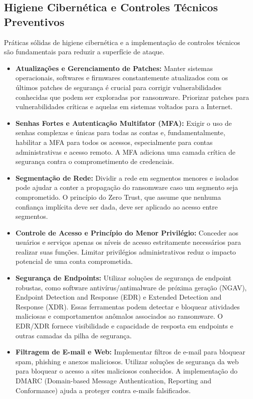 \subsection{Higiene Cibernética e Controles Técnicos Preventivos}
Práticas sólidas de higiene cibernética e a implementação de controles técnicos são fundamentais para reduzir a superfície de ataque.
\begin{itemize}
    \item \textbf{Atualizações e Gerenciamento de Patches:} Manter sistemas operacionais, softwares e firmwares constantemente atualizados com os últimos patches de segurança é crucial para corrigir vulnerabilidades conhecidas que podem ser exploradas por ransomware. Priorizar patches para vulnerabilidades críticas e aquelas em sistemas voltados para a Internet.
    \item \textbf{Senhas Fortes e Autenticação Multifator (MFA):} Exigir o uso de senhas complexas e únicas para todas as contas e, fundamentalmente, habilitar a MFA para todos os acessos, especialmente para contas administrativas e acesso remoto. A MFA adiciona uma camada crítica de segurança contra o comprometimento de credenciais.
    \item \textbf{Segmentação de Rede:} Dividir a rede em segmentos menores e isolados pode ajudar a conter a propagação do ransomware caso um segmento seja comprometido. O princípio do Zero Trust, que assume que nenhuma confiança implícita deve ser dada, deve ser aplicado ao acesso entre segmentos.
    \item \textbf{Controle de Acesso e Princípio do Menor Privilégio:} Conceder aos usuários e serviços apenas os níveis de acesso estritamente necessários para realizar suas funções. Limitar privilégios administrativos reduz o impacto potencial de uma conta comprometida.
    \item \textbf{Segurança de Endpoints:} Utilizar soluções de segurança de endpoint robustas, como software antivírus/antimalware de próxima geração (NGAV), Endpoint Detection and Response (EDR) e Extended Detection and Response (XDR). Essas ferramentas podem detectar e bloquear atividades maliciosas e comportamentos anômalos associados ao ransomware. O EDR/XDR fornece visibilidade e capacidade de resposta em endpoints e outras camadas da pilha de segurança.
    \item \textbf{Filtragem de E-mail e Web:} Implementar filtros de e-mail para bloquear spam, phishing e anexos maliciosos. Utilizar soluções de segurança da web para bloquear o acesso a sites maliciosos conhecidos. A implementação do DMARC (Domain-based Message Authentication, Reporting and Conformance) ajuda a proteger contra e-mails falsificados.

\end{itemize}
